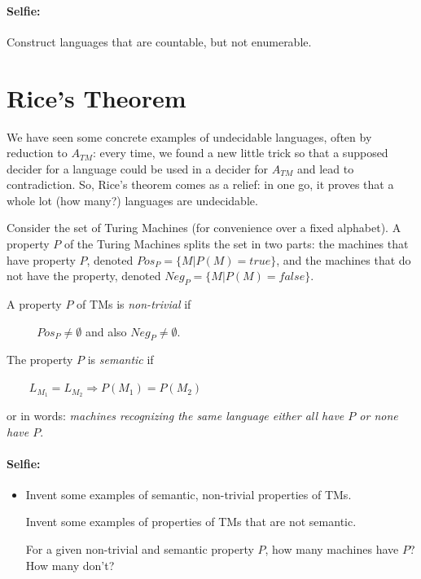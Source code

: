 \paragraph{Selfie:} Construct languages that are countable, but not enumerable.


\section{Rice's Theorem}

We have seen some concrete examples of undecidable languages, often by
reduction to $A_{TM}$: every time, we found a new little trick so that
a supposed decider for a language could be used in a decider for
$A_{TM}$ and lead to contradiction. So, Rice's theorem comes as a
relief: in one go, it proves that a whole lot (how many?) languages
are undecidable.

Consider the set of Turing Machines (for convenience over a fixed
alphabet). A property $P$ of the Turing Machines splits the set in two
parts: the machines that have property $P$, denoted
%
$Pos_P = \{M|P(M) = true\}$, and the machines that do not have the
property, denoted
%
$Neg_P = \{M|P(M) = false\}$.

\begin{definition}
A property $P$ of TMs is {\em non-trivial} if

$~~~~~~~~~~~~Pos_P \neq \emptyset$ and also $Neg_P \neq \emptyset$.
\end{definition}

\begin{definition}
The property $P$ is {\em semantic} if

$~~~~~~~~~L_{M_1} = L_{M_2} \Longrightarrow P(M_1) = P(M_2)$

or in words: {\em machines recognizing the same language either all
  have $P$ or none have $P$}.
\end{definition}

\paragraph{Selfie:}
\begin{itemize}
\item[]
Invent some examples of semantic, non-trivial
properties of TMs.

Invent some examples of properties of TMs that are not semantic.

For a given non-trivial and semantic property $P$, how many
machines have $P$? How many don't?
\end{itemize}



